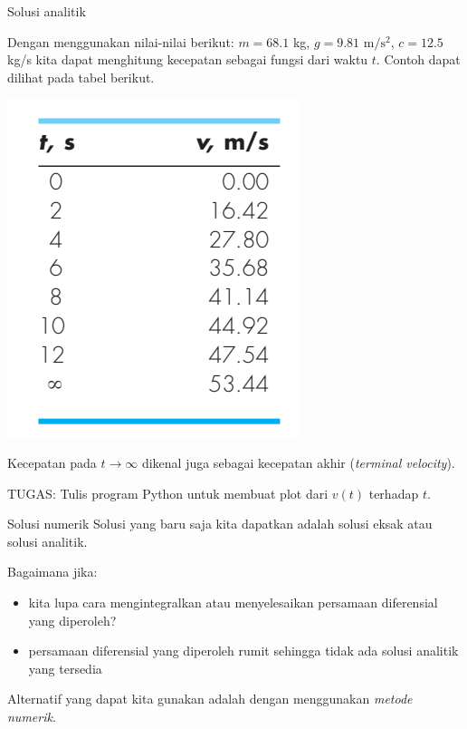 \begin{frame}{Solusi analitik}

\fontsize{9pt}{10pt}\selectfont

Dengan menggunakan nilai-nilai berikut: $m = 68.1$ kg, $g = 9.81$
$\mathrm{m}/\mathrm{s}^2$, $c = 12.5$ kg/s
kita dapat menghitung kecepatan sebagai fungsi dari waktu $t$.
Contoh dapat dilihat pada tabel berikut.

{\centering
\includegraphics[height=0.5\textheight]{../chapra_7th/Chapra_Example_1_1_table.png}
\par}

Kecepatan pada $t \rightarrow \infty$ dikenal juga sebagai kecepatan akhir
(\emph{terminal velocity}).

TUGAS: Tulis program Python untuk membuat plot dari $v(t)$ terhadap $t$.

\end{frame}



\begin{frame}{Solusi numerik}
Solusi yang baru saja kita dapatkan adalah solusi eksak atau solusi
analitik.

Bagaimana jika:

\begin{itemize}\tightlist
\item kita lupa cara mengintegralkan atau menyelesaikan persamaan
  diferensial yang diperoleh?
\item persamaan diferensial yang diperoleh rumit sehingga tidak ada
  solusi analitik yang tersedia
\end{itemize}

Alternatif yang dapat kita gunakan adalah dengan menggunakan
\emph{metode numerik}.
\end{frame}



